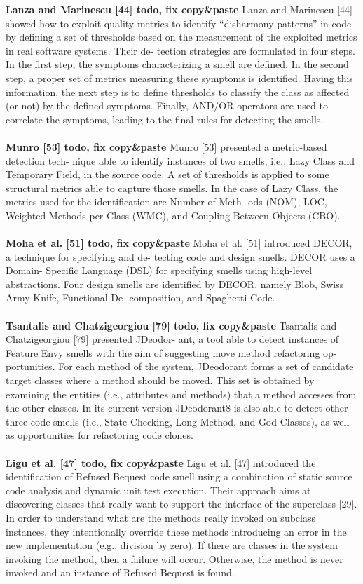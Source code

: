 \textbf{Lanza and Marinescu  [44] todo, fix copy\&paste }
Lanza and Marinescu [44] showed how to exploit quality metrics to identify “disharmony patterns” in code by defining a set of thresholds based on the measurement of the exploited metrics in real software systems. Their de- tection strategies are formulated in four steps. In the first step, the symptoms characterizing a smell are defined. In the second step, a proper set of metrics measuring these symptoms is identified. Having this information, the next step is to define thresholds to classify the class as affected (or not) by the defined symptoms. Finally, AND/OR operators are used to correlate the symptoms, leading to the final rules for detecting the smells.
\\
\\
\textbf{Munro [53] todo, fix copy\&paste }
Munro [53] presented a metric-based detection tech- nique able to identify instances of two smells, i.e., Lazy Class and Temporary Field, in the source code. A set of thresholds is applied to some structural metrics able to capture those smells. In the case of Lazy Class, the metrics used for the identification are Number of Meth- ods (NOM), LOC, Weighted Methods per Class (WMC), and Coupling Between Objects (CBO).
\\
\\
\textbf{Moha et al. [51] todo, fix copy\&paste }
Moha et al. [51] introduced DECOR, a technique for specifying and de- tecting code and design smells. DECOR uses a Domain- Specific Language (DSL) for specifying smells using high-level abstractions. Four design smells are identified by DECOR, namely Blob, Swiss Army Knife, Functional De- composition, and Spaghetti Code.
\\
\\
\textbf{Tsantalis and Chatzigeorgiou [79] todo, fix copy\&paste }
Tsantalis and Chatzigeorgiou [79] presented JDeodor- ant, a tool able to detect instances of Feature Envy smells with the aim of suggesting move method refactoring op- portunities. For each method of the system, JDeodorant forms a set of candidate target classes where a method should be moved. This set is obtained by examining the entities (i.e., attributes and methods) that a method accesses from the other classes. In its current version JDeodorant8 is also able to detect other three code smells (i.e., State Checking, Long Method, and God Classes), as well as opportunities for refactoring code clones.
\\
\\
\textbf{Ligu et al. [47] todo, fix copy\&paste }
Ligu et al. [47] introduced the identification of Refused Bequest code smell using a combination of static source code analysis and dynamic unit test execution. Their approach aims at discovering classes that really want to support the interface of the superclass [29]. In order to understand what are the methods really invoked on subclass instances, they intentionally override these methods introducing an error in the new implementation (e.g., division by zero). If there are classes in the system invoking the method, then a failure will occur. Otherwise, the method is never invoked and an instance of Refused Bequest is found.
\\
\\
